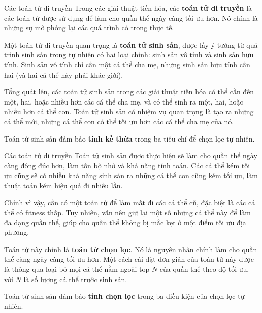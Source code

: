 \begin{frame}{Các toán tử di truyền}
  Trong các giải thuật tiến hóa, các \textbf{toán tử di truyền} là các toán tử
  được sử dụng để làm cho quần thể ngày càng tối ưu hơn. Nó chính là những sự mô
  phỏng lại các quá trình có trong thực tế.

  Một toán tử di truyền quan trọng là \textbf{toán tử sinh sản}, được lấy ý tưởng từ
  quá trình sinh sản trong tự nhiên có hai loại chính: sinh sản vô tính và sinh
  sản hữu tính. Sinh sản vô tính chỉ cần một cá thể cha mẹ, nhưng sinh sản hữu
  tính cần hai (và hai cá thể này phải khác giới).

  Tổng quát lên, các toán tử sinh sản trong các giải thuật tiến hóa có thể cần
  đến một,  hai, hoặc nhiều hơn các cá thể cha mẹ, và có thể sinh ra một, hai,
  hoặc nhiều hơn cá thể con. Toán tử sinh sản có nhiệm vụ quan trọng là tạo ra
  những cá thể mới, những cá thể con có thể tối ưu hơn các cá thể cha mẹ của nó.

  Toán tử sinh sản đảm bảo \textbf{tính kế thừa} trong ba tiêu chí để chọn lọc
  tự nhiên.
\end{frame}

\begin{frame}{Các toán tử di truyền}
  Toán tử sinh sản được thực hiện sẽ làm cho quần thể ngày càng đông đúc hơn,
  làm tốn bộ nhớ và khả năng tính toán. Các cá thể kém tối ưu cũng sẽ có nhiều
  khả năng sinh sản ra những cá thể con cũng kém tối ưu, làm thuật toán kém hiệu
  quả đi nhiều lần.

  Chính vì vậy, cần có một toán tử để làm mất đi các cá thể cũ, đặc biệt là các
  cá thể có fitness thấp. Tuy nhiên, vẫn nên giữ lại một số những cá thể này để
  làm đa dạng quần thể, giúp cho quần thể không bị mắc kẹt ở một điểm tối ưu địa
  phương.

  Toán tử này chính là \textbf{toán tử chọn lọc}. Nó là nguyên nhân chính
  làm cho quần thể càng ngày càng tối ưu hơn. Một cách cài đặt đơn giản của toán
  tử này được là thông qua loại bỏ mọi cá thể nằm ngoài top $N$ của quần thể
  theo độ tối ưu, với $N$ là số lượng cá thể trước sinh sản.

  Toán tử sinh sản đảm bảo \textbf{tính chọn lọc} trong ba điều kiện của chọn
  lọc tự nhiên.
\end{frame}

